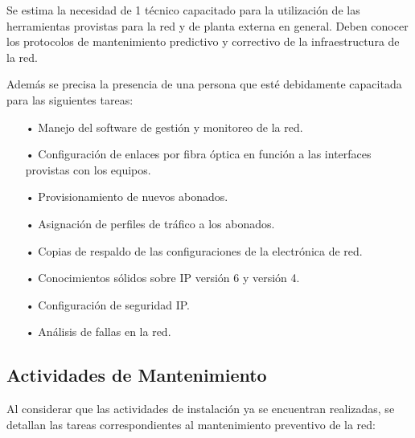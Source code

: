 Se estima la necesidad de 1 técnico capacitado para la utilización de las herramientas provistas para la red y de planta externa en general. Deben conocer los protocolos de mantenimiento predictivo y correctivo de la infraestructura de la red. 


Además se precisa la presencia de una persona que esté debidamente capacitada para las siguientes tareas:

\begin{itemize}

\item[•]Manejo del software de gestión y monitoreo de la red.

\item[•]Configuración de enlaces por fibra óptica en función a las interfaces provistas con los equipos. 

\item[•]Provisionamiento de nuevos abonados. 

\item[•]Asignación de perfiles de tráfico a los abonados. 

\item[•]Copias de respaldo de las configuraciones de la electrónica de red. 


\item[•]Conocimientos sólidos sobre IP versión 6 y versión 4.


\item[•]Configuración de seguridad IP.

\item[•]Análisis de fallas en la red.


\end{itemize}








\subsection{Actividades de Mantenimiento}
Al considerar que las actividades de instalación ya se encuentran realizadas, se detallan las tareas correspondientes al mantenimiento preventivo de la red:


